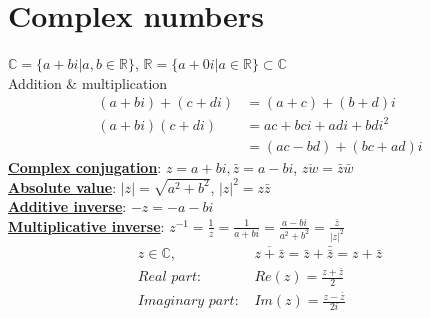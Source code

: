 \documentclass[11pt,a4paper]{article}
\begin{document}
\section{Complex numbers}
$\mathbb{C}=\{a+bi | a,b\in\mathbb{R}\}$, $\mathbb{R}=\{a+0i | a\in\mathbb{R}\}\subset \mathbb{C}$\\
Addition $\&$ multiplication
\begin{equation}
    \begin{aligned}
        (a + bi) + (c + di) &= (a + c) + (b + d)i\\
        (a + bi )(c + di) &= ac + bci + adi + bdi^2\\
        &= (ac-bd) + (bc + ad)i
    \end{aligned}
    \nonumber
\end{equation}
\textbf{\underline{Complex conjugation}}: $z = a + bi , \bar{z} = a - bi$, $\overline{zw}=\bar{z}\bar{w}$\\
\textbf{\underline{Absolute value}}: $|z| = \sqrt{a^2+b^2}$, $|z|^2=z\bar{z}$\\
\textbf{\underline{Additive inverse}}: $-z=-a-bi$\\
\textbf{\underline{Multiplicative inverse}}: $z^{-1}=\frac{1}{z}=\frac{1}{a+bi}=\frac{a-bi}{a^2+b^2}=\frac{\bar{z}}{|z|^2}$\\
\begin{equation}
    \begin{aligned}
        z\in\mathbb{C}, &\overline{z+\bar{z}}=\bar{z}+\bar{\bar{z}}=z+\bar{z}\\
        \textit{Real part: }&Re(z)=\frac{z+\bar{z}}{2}\\
        \textit{Imaginary part: }&Im(z)=\frac{z-\bar{z}}{2i}\\
    \end{aligned}
    \nonumber
\end{equation}
\end{document}
